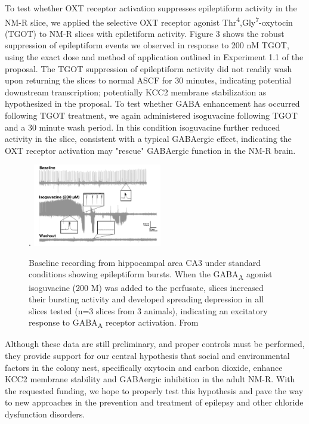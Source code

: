 \documentclass[11pt]{nih}
\begin{document}
\par To test whether OXT receptor activation suppresses epileptiform activity in the NM-R slice, we applied the selective OXT receptor agonist Thr\textsuperscript{4},Gly\textsuperscript{7}-oxytocin (TGOT) to NM-R slices with epiletiform activity.  Figure 3 shows the robust suppression of epileptiform events we observed in response to  200 nM TGOT, using the exact dose and method of application outlined in Experiment 1.1 of the proposal. The TGOT suppression of epileptiform activity did not readily wash upon returning the slices to normal ASCF for 30 minutes, indicating potential downstream transcription; potentially KCC2 membrane stabilization as hypothesized in the proposal. To test whether GABA enhancement has occurred following TGOT treatment, we again administered isoguvacine following TGOT and a 30 minute wash period.  In this condition isoguvacine further reduced activity in the slice, consistent with a typical GABAergic effect, indicating the OXT receptor activation may "rescue" GABAergic function in the NM-R brain. 
\begin{figure}.
 \centering
 \includegraphics[width=0.5\textwidth]{isoguvacine.png}
 \caption{Baseline recording from hippocampal area CA3 under standard conditions showing epileptiform bursts.  When the GABA\textsubscript {A} agonist isoguvacine (200 \textmu M) was added to the perfusate, slices  increased their bursting activity and developed spreading depression in all slices tested (n=3 slices from 3 animals), indicating an excitatory response to GABA\textsubscript {A} receptor activation.  From \cite{zions_2020_nest}}
\end{figure}
\par Although these data are still preliminary, and proper controls must be performed, they provide support for our central hypothesis that social and environmental factors in the colony nest, specifically oxytocin and carbon dioxide, enhance KCC2 membrane stability and GABAergic inhibition in the adult NM-R.  With the requested funding, we hope to properly test this hypothesis and pave the way to new approaches in the prevention and treatment of epilepsy and other chloride dysfunction disorders.


\newpage

\end{document}
